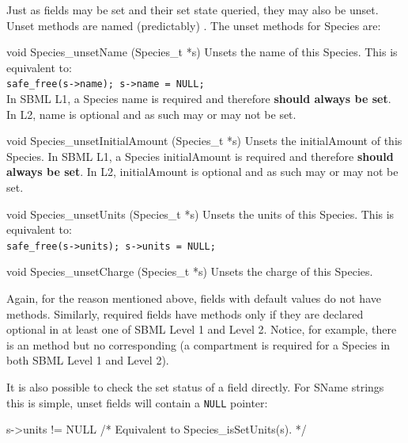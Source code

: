 \documentclass{cekmanual}
\begin{document}
Just as fields may be set and their set state queried, they may also
be unset.  Unset methods are named (predictably)
.  The unset methods for Species are:


\begin{methoddef}{void Species\_unsetName (Species\_t *s)}
  Unsets the name of this Species.  This is equivalent to:\\
  \texttt{safe\_free(s->name); s->name = NULL;}\\

  In SBML L1, a Species name is required and therefore \textbf{should
  always be set}.  In L2, name is optional and as such may or may not
  be set.
\end{methoddef}

\begin{methoddef}{void Species\_unsetInitialAmount (Species\_t *s)}
  Unsets the initialAmount of this Species.  In SBML L1, a Species
  initialAmount is required and therefore \textbf{should always be
  set}.  In L2, initialAmount is optional and as such may or may not
  be set.
\end{methoddef}

\begin{methoddef}{void Species\_unsetUnits (Species\_t *s)}
  Unsets the units of this Species.  This is equivalent to:\\
  \texttt{safe\_free(s->units); s->units = NULL;}
\end{methoddef}

\begin{methoddef}{void Species\_unsetCharge (Species\_t *s)}
  Unsets the charge of this Species.
\end{methoddef}

Again, for the reason mentioned above, fields with default values do
not have  methods.  Similarly, required fields have
 methods only if they are declared optional in at
least one of SBML Level 1 and Level 2.  Notice, for example, there is
an  method but no corresponding
 (a compartment is required for a Species
in both SBML Level 1 and Level 2).

It is also possible to check the set status of a field directly.  For
SName strings this is simple, unset fields will contain a
\texttt{NULL} pointer:

\begin{example}
  s->units != NULL  /* Equivalent to Species_isSetUnits(s). */
\end{example}
\end{document}
